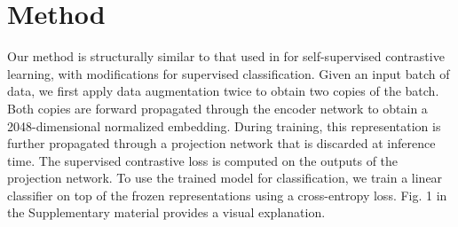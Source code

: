 \section{Method}

Our method is structurally similar to that used in \cite{tian2019contrastive,chen2020simple} for self-supervised contrastive learning, with modifications for supervised classification. Given an input batch of data, we first apply data augmentation twice to obtain two copies of the batch. Both copies are forward propagated through the encoder network to obtain a 2048-dimensional normalized embedding. During training, this representation is further propagated through a projection network that is discarded at inference time. The supervised contrastive loss is computed on the outputs of the projection network. To use the trained model for classification, we train a linear classifier on top of the frozen representations using a cross-entropy loss. Fig. 1 in the Supplementary material provides a visual explanation.



